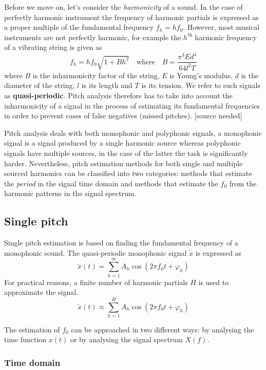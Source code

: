 \documentclass[
  american,
]{article}
\begin{document}
Before we move on, let's consider the \emph{harmonicity} of a sound.
In the case of perfectly harmonic instrument the frequency
of harmonic partials is expressed as a proper multiple
of the fundamental frequency \(f_h = h f_0\).
However, most musical instruments are not perfectly harmonic,
for example the \(h^\text{th}\) harmonic frequency
of a vibrating string is given as
\[ f_h = h f_0 \sqrt{1 + Bh^2} \quad\text{where}\quad
    B = \frac{\pi^3 Ed^4}{64l^2T}\]
where \(B\) is the inharmonicity factor of the string,
\(E\) is Young's modulus, \(d\) is the diameter of the string,
\(l\) is its length and \(T\) is its tension.
We refer to such signals as \textbf{quasi-periodic}.
Pitch analysis therefore has to take into account
the inharmonicity of a signal in the process of estimating
its fundamental frequencies in order to prevent
cases of false negatives (missed pitches).
{[}source needed{]}

Pitch analysis deals with both monophonic and polyphonic signals,
a monophonic signal is a signal produced by a single harmonic
source whereas polyphonic signals have multiple sources,
in the case of the latter the
task is significantly harder.
Nevertheless, pitch estimation methods for both
single and multiple sourced harmonics can be
classified into two categories: methods that
estimate the \emph{period} in the signal time domain
and methods that estimate the \(f_0\) from the harmonic
patterns in the signal spectrum.

\hypertarget{single-pitch}{%
\subsection{Single pitch}\label{single-pitch}}

Single pitch estimation is based on finding the fundamental
frequency of a monophonic sound.
The quasi-periodic monophonic signal \(\tilde{x}\) is expressed as
\[\tilde{x}(t)=\sum_{h=1}^{\infty} A_h\cos(2\pi f_0 t + \varphi_h)\]
For practical reasons, a finite number of harmonic
partials \(H\) is used to approximate the signal.
\[\tilde{x}(t)\approx\sum_{h=1}^{H} A_h\cos(2\pi f_0 t + \varphi_h)\]

The estimation of \(f_0\) can be approached in two
different ways: by analysing the time function \(x(t)\)
or by analysing the signal spectrum \(X(f)\).

\hypertarget{time-domain}{%
\subsubsection{Time domain}\label{time-domain}}
\end{document}

